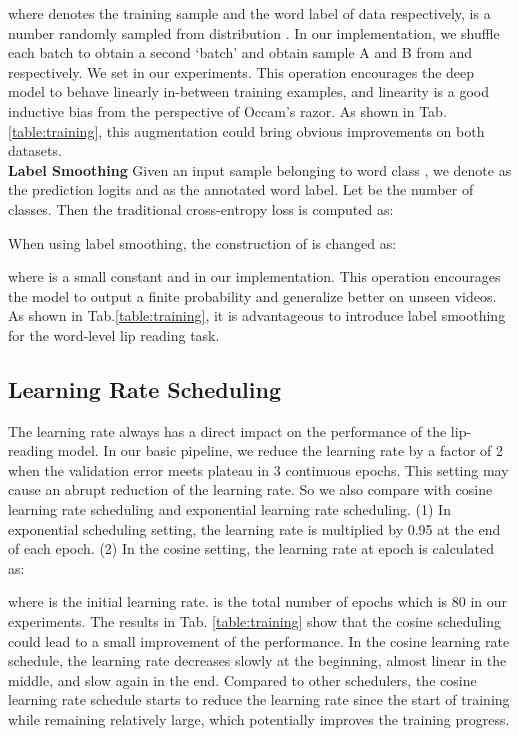 \documentclass{article}
\begin{document}
where  denotes the training sample and the word label of data  respectively,  is a number randomly sampled from distribution . In our implementation, we shuffle each batch  to obtain a second `batch'  and obtain sample A and B from  and  respectively. We set  in our experiments. This operation encourages the deep model to behave linearly in-between training examples, and linearity is a good inductive bias from the perspective of Occam’s razor. As shown in Tab.\ref{table:training}, this augmentation could bring obvious improvements on both datasets. 
\vspace{0.5em}
\\
\indent\textbf{Label Smoothing} Given an input sample belonging to word class , we denote  as the prediction logits and  as the annotated word label. Let  be the number of classes. Then the traditional cross-entropy loss is computed as:

When using label smoothing, the construction of  is changed as:

where  is a small constant and  in our implementation. This operation encourages the model to output a finite probability and generalize better on unseen videos. As shown in Tab.\ref{table:training}, it is advantageous to introduce label smoothing for the word-level lip reading task.
\vspace{-0.5em}
\subsection{Learning Rate Scheduling} 
The learning rate always has a direct impact on the performance of the lip-reading model. 
In our basic pipeline, we reduce the learning rate by a factor of 2 when the validation error meets plateau in 3 continuous epochs. This setting may cause an abrupt reduction of the learning rate. So we also compare with cosine learning rate scheduling and exponential learning rate scheduling. (1) In exponential scheduling setting, the learning rate is multiplied by 0.95 at the end of each epoch. (2) In the cosine setting, the learning rate  at epoch  is calculated as:

where  is the initial learning rate.  is the total number of epochs which is 80 in our experiments. The results in Tab. \ref{table:training} show that the cosine scheduling could lead to a small improvement of the performance. In the cosine learning rate schedule, the learning rate decreases slowly at the beginning, almost linear in the middle, and slow again in the end. Compared to other schedulers, the cosine learning rate schedule starts to reduce the learning rate since the start of training while remaining relatively large, which potentially improves the training progress.
\vspace{-0.5em}
\end{document}

